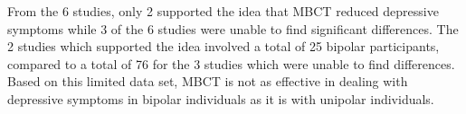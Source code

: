 From the 6 studies, only 2 supported the idea that MBCT reduced depressive symptoms while 3 of the 6 studies were unable to find significant differences. The 2 studies which supported the idea involved a total of 25 bipolar participants, compared to a total of 76 for the 3 studies which were unable to find differences. Based on this limited data set, MBCT is not as effective in dealing with depressive symptoms in bipolar individuals as it is with unipolar individuals.